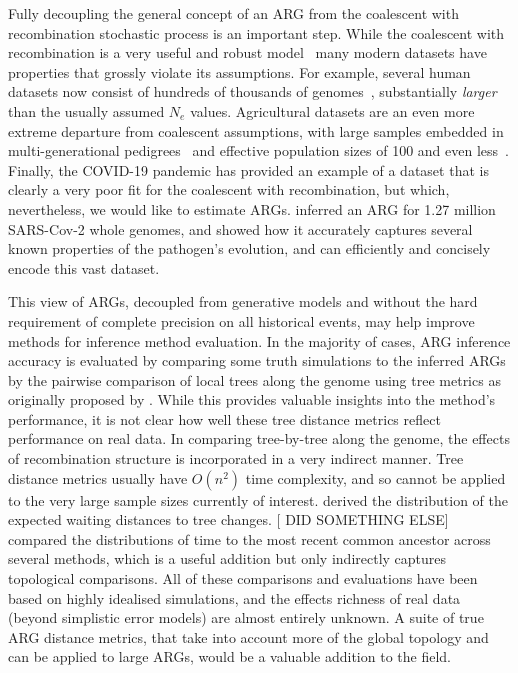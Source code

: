 \documentclass{article}
\begin{document}
Fully decoupling the general concept of an ARG from the coalescent
with recombination stochastic process is an important step.
While the coalescent with recombination is a very useful and
robust model~\citep{wakeley2012gene,bhaskar2014distortion,nelson2020accounting}
many modern datasets have properties that grossly
violate its assumptions.
For example, several human datasets now consist of hundreds of thousands of
genomes~\citep{bycroft2018genome,karczewski2020mutational,tanjo2021practical},
substantially \emph{larger} than the usually assumed $N_e$ values.
Agricultural datasets are an even more extreme departure from coalescent
assumptions, with large samples embedded in
multi-generational pedigrees~\citep{hayes20191000,Ros-Freixedes2020}
and effective population sizes of 100 and even
less~\citep{MacLeod2013,Makanjuola2020,Hall2016,Porcnic2016}.
Finally, the COVID-19 pandemic has provided an example of a dataset that
is clearly a very poor fit for the coalescent with recombination, but which,
nevertheless, we would like to estimate ARGs.
\cite{zhan2023towards} inferred an ARG for 1.27 million SARS-Cov-2 whole
genomes, and showed how it accurately captures several known properties of
the pathogen's evolution, and can efficiently and concisely
encode this vast dataset.

This view of ARGs,
decoupled from generative models and
without the hard requirement
of complete precision on all historical events, may help improve
methods for inference method evaluation. In the majority of cases,
ARG inference accuracy is evaluated by comparing some truth simulations
to the inferred ARGs by the pairwise comparison of local trees along the genome
using tree metrics as originally proposed by \citet{kuhner2015assessing}.
While this provides valuable insights into the method's performance,
it is not clear how well these tree distance metrics reflect
performance on real data.
In comparing tree-by-tree along the genome, the effects of recombination
structure is incorporated in a very indirect manner.
Tree distance metrics usually have $O(n^2)$ time complexity, and so cannot be
applied to the very large sample sizes currently of interest.
\citet{deng2021distribution} derived the distribution of the expected
waiting distances to tree changes.
[ \citet{ignatieva2023distribution} DID SOMETHING ELSE]
\citet{brandt2021evaluation} compared the
distributions of time to the most recent common ancestor across several
methods, which is a useful addition but only indirectly captures
topological comparisons.
All of these comparisons and evaluations have been based on
highly idealised simulations, and the effects richness of real data
(beyond simplistic error models) are almost entirely unknown.
A suite of true ARG distance metrics, that take into account more of the
global topology and can be applied to large ARGs, would be a
valuable addition to the field.
\end{document}
